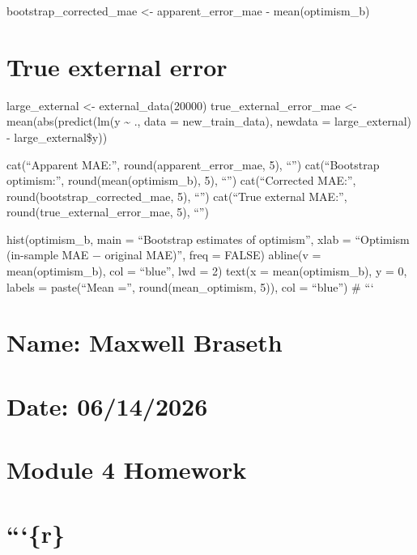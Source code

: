 \documentclass[
  letterpaper,
  DIV=11,
  numbers=noendperiod]{scrreprt}
\begin{document}
bootstrap\_corrected\_mae \textless- apparent\_error\_mae -
mean(optimism\_b)


\chapter{True external error}\label{true-external-error}

large\_external \textless- external\_data(20000)
true\_external\_error\_mae \textless- mean(abs(predict(lm(y
\textasciitilde{} ., data = new\_train\_data), newdata =
large\_external) - large\_external\$y))

cat(``Apparent MAE:'', round(apparent\_error\_mae, 5), ``\n'')
cat(``Bootstrap optimism:'', round(mean(optimism\_b), 5), ``\n'')
cat(``Corrected MAE:'', round(bootstrap\_corrected\_mae, 5), ``\n'')
cat(``True external MAE:'', round(true\_external\_error\_mae, 5),
``\n'')

hist(optimism\_b, main = ``Bootstrap estimates of optimism'', xlab =
``Optimism (in-sample MAE − original MAE)'', freq = FALSE) abline(v =
mean(optimism\_b), col = ``blue'', lwd = 2) text(x = mean(optimism\_b),
y = 0, labels = paste(``Mean ='', round(mean\_optimism, 5)), col =
``blue'') \# ```


\chapter{Name: Maxwell Braseth}\label{name-maxwell-braseth}


\chapter{Date: 06/14/2026}\label{date-06142026}


\chapter{Module 4 Homework}\label{module-4-homework}


\chapter{```\{r\}}\label{r-3}
\end{document}
